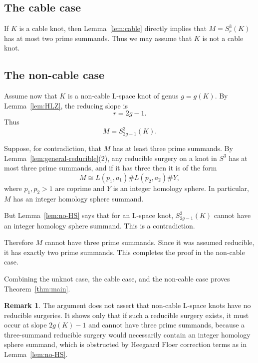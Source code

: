 \documentclass{article}
\theoremstyle{definition}
\newtheorem{remark}[theorem]{Remark}
\begin{document}
\subsection*{The cable case}
If \(K\) is a cable knot, then Lemma~\ref{lem:cable} directly implies that
\(M=S^{3}_{r}(K)\) has at most two prime summands.  Thus we may assume that
\(K\) is not a cable knot.

\subsection*{The non-cable case}
Assume now that \(K\) is a non-cable L-space knot of genus \(g=g(K)\).
By Lemma~\ref{lem:HLZ}, the reducing slope is
\[
  r=2g-1.
\]
Thus
\[
  M=S^{3}_{2g-1}(K).
\]

Suppose, for contradiction, that \(M\) has at least three prime summands.
By Lemma~\ref{lem:general-reducible}(2), any reducible surgery on a knot in
\(S^{3}\) has at most three prime summands, and if it has three then it is of
the form
\[
  M\cong L(p_{1},a_{1})\# L(p_{2},a_{2})\# Y,
\]
where \(p_{1},p_{2}>1\) are coprime and \(Y\) is an integer homology sphere.
In particular, \(M\) has an integer homology sphere summand.

But Lemma~\ref{lem:no-HS} says that for an L-space knot,
\(S^{3}_{2g-1}(K)\) cannot have an integer homology sphere summand.  This is a
contradiction.

Therefore \(M\) cannot have three prime summands.  Since it was assumed
reducible, it has exactly two prime summands.  This completes the proof in
the non-cable case.

Combining the unknot case, the cable case, and the non-cable case proves
Theorem~\ref{thm:main}.

\begin{remark}
The argument does not assert that non-cable L-space knots have no reducible
surgeries.  It shows only that if such a reducible surgery exists, it must
occur at slope \(2g(K)-1\) and cannot have three prime summands, because a
three-summand reducible surgery would necessarily contain an integer homology
sphere summand, which is obstructed by Heegaard Floer correction terms as in
Lemma~\ref{lem:no-HS}.
\end{remark}
\end{document}
